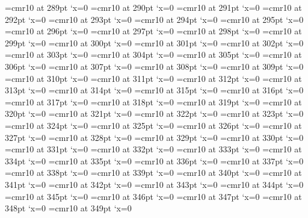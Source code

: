 \font\FBPX=cmr10 at 289pt \lpcode\FBPX`x=0
\font\FBPY=cmr10 at 290pt \lpcode\FBPY`x=0
\font\FBPZ=cmr10 at 291pt \lpcode\FBPZ`x=0
\font\FBQA=cmr10 at 292pt \lpcode\FBQA`x=0
\font\FBQB=cmr10 at 293pt \lpcode\FBQB`x=0
\font\FBQC=cmr10 at 294pt \lpcode\FBQC`x=0
\font\FBQD=cmr10 at 295pt \lpcode\FBQD`x=0
\font\FBQE=cmr10 at 296pt \lpcode\FBQE`x=0
\font\FBQF=cmr10 at 297pt \lpcode\FBQF`x=0
\font\FBQG=cmr10 at 298pt \lpcode\FBQG`x=0
\font\FBQH=cmr10 at 299pt \lpcode\FBQH`x=0
\font\FBQI=cmr10 at 300pt \lpcode\FBQI`x=0
\font\FBQJ=cmr10 at 301pt \lpcode\FBQJ`x=0
\font\FBQK=cmr10 at 302pt \lpcode\FBQK`x=0
\font\FBQL=cmr10 at 303pt \lpcode\FBQL`x=0
\font\FBQM=cmr10 at 304pt \lpcode\FBQM`x=0
\font\FBQN=cmr10 at 305pt \lpcode\FBQN`x=0
\font\FBQO=cmr10 at 306pt \lpcode\FBQO`x=0
\font\FBQP=cmr10 at 307pt \lpcode\FBQP`x=0
\font\FBQQ=cmr10 at 308pt \lpcode\FBQQ`x=0
\font\FBQR=cmr10 at 309pt \lpcode\FBQR`x=0
\font\FBQS=cmr10 at 310pt \lpcode\FBQS`x=0
\font\FBQT=cmr10 at 311pt \lpcode\FBQT`x=0
\font\FBQU=cmr10 at 312pt \lpcode\FBQU`x=0
\font\FBQV=cmr10 at 313pt \lpcode\FBQV`x=0
\font\FBQW=cmr10 at 314pt \lpcode\FBQW`x=0
\font\FBQX=cmr10 at 315pt \lpcode\FBQX`x=0
\font\FBQY=cmr10 at 316pt \lpcode\FBQY`x=0
\font\FBQZ=cmr10 at 317pt \lpcode\FBQZ`x=0
\font\FBRA=cmr10 at 318pt \lpcode\FBRA`x=0
\font\FBRB=cmr10 at 319pt \lpcode\FBRB`x=0
\font\FBRC=cmr10 at 320pt \lpcode\FBRC`x=0
\font\FBRD=cmr10 at 321pt \lpcode\FBRD`x=0
\font\FBRE=cmr10 at 322pt \lpcode\FBRE`x=0
\font\FBRF=cmr10 at 323pt \lpcode\FBRF`x=0
\font\FBRG=cmr10 at 324pt \lpcode\FBRG`x=0
\font\FBRH=cmr10 at 325pt \lpcode\FBRH`x=0
\font\FBRI=cmr10 at 326pt \lpcode\FBRI`x=0
\font\FBRJ=cmr10 at 327pt \lpcode\FBRJ`x=0
\font\FBRK=cmr10 at 328pt \lpcode\FBRK`x=0
\font\FBRL=cmr10 at 329pt \lpcode\FBRL`x=0
\font\FBRM=cmr10 at 330pt \lpcode\FBRM`x=0
\font\FBRN=cmr10 at 331pt \lpcode\FBRN`x=0
\font\FBRO=cmr10 at 332pt \lpcode\FBRO`x=0
\font\FBRP=cmr10 at 333pt \lpcode\FBRP`x=0
\font\FBRQ=cmr10 at 334pt \lpcode\FBRQ`x=0
\font\FBRR=cmr10 at 335pt \lpcode\FBRR`x=0
\font\FBRS=cmr10 at 336pt \lpcode\FBRS`x=0
\font\FBRT=cmr10 at 337pt \lpcode\FBRT`x=0
\font\FBRU=cmr10 at 338pt \lpcode\FBRU`x=0
\font\FBRV=cmr10 at 339pt \lpcode\FBRV`x=0
\font\FBRW=cmr10 at 340pt \lpcode\FBRW`x=0
\font\FBRX=cmr10 at 341pt \lpcode\FBRX`x=0
\font\FBRY=cmr10 at 342pt \lpcode\FBRY`x=0
\font\FBRZ=cmr10 at 343pt \lpcode\FBRZ`x=0
\font\FBSA=cmr10 at 344pt \lpcode\FBSA`x=0
\font\FBSB=cmr10 at 345pt \lpcode\FBSB`x=0
\font\FBSC=cmr10 at 346pt \lpcode\FBSC`x=0
\font\FBSD=cmr10 at 347pt \lpcode\FBSD`x=0
\font\FBSE=cmr10 at 348pt \lpcode\FBSE`x=0
\font\FBSF=cmr10 at 349pt \lpcode\FBSF`x=0
